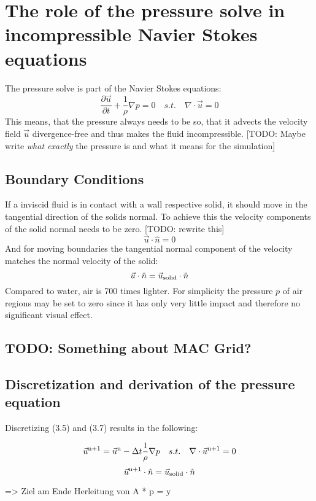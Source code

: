 \section{The role of the pressure solve in incompressible Navier Stokes equations}
The pressure solve is part of the Navier Stokes equations:
\begin{equation} \label{navier-stokes-pressure}
\frac{\partial \vec{u}}{\partial t} + \frac{1}{\rho}  \nabla p = 0 \quad s.t. \quad \nabla \cdot \vec{u} = 0
\end{equation}
This means, that the pressure always needs to be so, that it advects the velocity field $\vec{u}$ divergence-free and thus makes the fluid incompressible.  [TODO: Maybe write \textit{what exactly} the pressure is and what it means for the simulation]

\subsection{Boundary Conditions}
If a inviscid fluid is in contact with a wall respective solid, it should move in the tangential direction of the solids normal. To achieve this the velocity components of the solid normal needs to be zero. [TODO: rewrite this]
\begin{equation} \label{navier-stokes12}
\vec{u} \cdot \hat{n} = 0
\end{equation}
And for moving boundaries the tangential normal component of the velocity matches the normal velocity of the solid:
\begin{equation} \label{navier-stokes12}
\vec{u} \cdot \hat{n} = \vec{u} \textsubscript{solid} \cdot \hat{n}
\end{equation}
Compared to water, air is 700 times lighter. For simplicity the pressure $p$ of air regions may be set to zero since it has only very little impact and therefore no significant visual effect.

\subsection{TODO: Something about MAC Grid?}

\subsection{Discretization and derivation of the pressure equation}
Discretizing (3.5) and (3.7) results in the following:

\begin{equation} \label{navier-stokes12}
\vec{u} \textsuperscript{n+1} = \vec{u} \textsuperscript{n} - \Delta t \frac{1}{\rho} \nabla p \quad s.t. \quad \nabla \cdot \vec{u} \textsuperscript{n+1} = 0
\end{equation}
\begin{equation} \label{navier-stokes12}
\vec{u} \textsuperscript{n+1} \cdot \hat{n} = \vec{u} \textsubscript{solid} \cdot \hat{n}
\end{equation}


=> Ziel am Ende Herleitung von A * p = y




